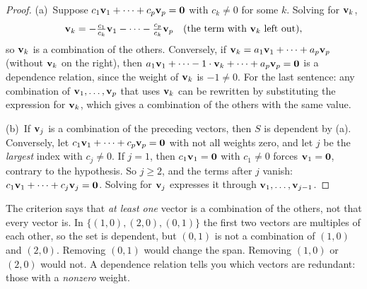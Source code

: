 \documentclass[11pt]{article}
\begin{document}
\begin{proof}
(a)~Suppose $c_1\mathbf{v}_1+\cdots+c_p\mathbf{v}_p=\mathbf{0}$ with $c_k\neq0$ for some $k$. Solving for $\mathbf{v}_k$,
\[
\mathbf{v}_k=-\tfrac{c_1}{c_k}\mathbf{v}_1-\cdots-\tfrac{c_p}{c_k}\mathbf{v}_p\quad(\text{the term with }\mathbf{v}_k\text{ left out}),
\]
so $\mathbf{v}_k$ is a combination of the others. Conversely, if $\mathbf{v}_k=a_1\mathbf{v}_1+\cdots+a_p\mathbf{v}_p$ (without $\mathbf{v}_k$ on the right), then $a_1\mathbf{v}_1+\cdots-1\cdot\mathbf{v}_k+\cdots+a_p\mathbf{v}_p=\mathbf{0}$ is a dependence relation, since the weight of $\mathbf{v}_k$ is $-1\neq0$. For the last sentence: any combination of $\mathbf{v}_1,\dots,\mathbf{v}_p$ that uses $\mathbf{v}_k$ can be rewritten by substituting the expression for $\mathbf{v}_k$, which gives a combination of the others with the same value.

(b)~If $\mathbf{v}_j$ is a combination of the preceding vectors, then $S$ is dependent by (a). Conversely, let $c_1\mathbf{v}_1+\cdots+c_p\mathbf{v}_p=\mathbf{0}$ with not all weights zero, and let $j$ be the \emph{largest} index with $c_j\neq0$. If $j=1$, then $c_1\mathbf{v}_1=\mathbf{0}$ with $c_1\neq0$ forces $\mathbf{v}_1=\mathbf{0}$, contrary to the hypothesis. So $j\ge2$, and the terms after $j$ vanish: $c_1\mathbf{v}_1+\cdots+c_j\mathbf{v}_j=\mathbf{0}$. Solving for $\mathbf{v}_j$ expresses it through $\mathbf{v}_1,\dots,\mathbf{v}_{j-1}$.
\end{proof}

\begin{warn}
The criterion says that \emph{at least one} vector is a combination of the others, not that every vector is. In $\{(1,0),(2,0),(0,1)\}$ the first two vectors are multiples of each other, so the set is dependent, but $(0,1)$ is not a combination of $(1,0)$ and $(2,0)$. Removing $(0,1)$ would change the span. Removing $(1,0)$ or $(2,0)$ would not. A dependence relation tells you which vectors are redundant: those with a \emph{nonzero} weight.
\end{warn}
\end{document}
